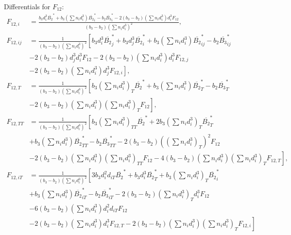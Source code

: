 \documentclass[english]{../thermomemo/thermomemo}
\newcommand*{\lb}{\left(}
\newcommand*{\rb}{\right)}
\begin{document}
Differentials for $F_{12}$:
\begin{align}
  \label{eq:F12_diff}
    F_{12,i}  &=  \frac{b_3  d_i^3  \overline{B_2}^* + b_3 \lb \sum n_i d_i^3 \rb  \overline{B_2}^*_i - b_2 \overline{B_3}^*_i - 2\lb b_3-b_2\rb \lb \sum n_i d_i^3 \rb d_i^3 F_{12}}{\lb b_3-b_2\rb \lb \sum n_i d_i^3 \rb^2}, \\
    F_{12,ij}  &=  \frac{1}{\lb b_3-b_2\rb \lb \sum n_i d_i^3 \rb^2}
    \left[ b_3  d_i^3  \overline{B_2}^*_j + b_3 d_j^3  \overline{B_2}^*_i + b_3 \lb \sum n_i d_i^3 \rb  \overline{B_2}^*_{ij} - b_2 \overline{B_3}^*_{ij} \right. \nonumber \\ &- 2\lb b_3-b_2\rb d_j^3 d_i^3 F_{12} - 2\lb b_3-b_2\rb \lb \sum n_i d_i^3 \rb d_i^3 F_{12,j} \nonumber \\ & \left.- 2\lb b_3-b_2\rb \lb \sum n_i d_i^3 \rb d_j^3 F_{12,i} \right],\\
    F_{12,T} &=  \frac{1}{\lb b_3-b_2\rb \lb \sum n_i d_i^3 \rb^2} \left[ b_3 \lb \sum n_i d_i^3 \rb_T  \overline{B_2}^* + b_3 \lb \sum n_i d_i^3 \rb  \overline{B_2}^*_T - b_2 \overline{B_3}^*_T \right. \nonumber \\ & \left. - 2\lb b_3-b_2\rb \lb \sum n_i d_{i}^3 \rb \lb \sum n_i d_{i}^3 \rb_T F_{12} \right] , \\
    F_{12,TT} &= \frac{1}{\lb b_3-b_2\rb \lb \sum n_i d_i^3 \rb^2} \left[ b_3 \lb \sum n_i d_i^3 \rb_{TT}  \overline{B_2}^* + 2 b_3 \lb \sum n_i d_i^3 \rb_T  \overline{B_2}^*_T \right. \nonumber \\
      & + b_3 \lb \sum n_i d_i^3 \rb  \overline{B_2}^*_{TT} - b_2 \overline{B_3}^*_{TT} - 2\lb b_3-b_2\rb \lb \lb \sum n_i d_{i}^3 \rb_T \rb^2 F_{12} \nonumber \\ & \left. - 2\lb b_3-b_2\rb \lb \sum n_i d_{i}^3 \rb \lb \sum n_i d_{i}^3 \rb_{TT} F_{12} - 4\lb b_3-b_2\rb \lb \sum n_i d_{i}^3 \rb \lb \sum n_i d_{i}^3 \rb_T F_{12,T} \right], \\
  F_{12,iT}  &= \frac{1}{\lb b_3-b_2\rb \lb \sum n_i d_i^3 \rb^2} \left[ 3 b_3  d_i^2 d_{iT}  \overline{B_2}^* + b_3  d_i^3  \overline{B_2}^*_T + b_3 \lb \sum n_i d_i^3 \rb_T  \overline{B_2}^*_i \right. \nonumber \\ & + b_3 \lb \sum n_i d_i^3 \rb  \overline{B_2}^*_{iT} - b_2 \overline{B_3}^*_{iT} - 2\lb b_3-b_2\rb \lb \sum n_i d_i^3 \rb_T d_i^3 F_{12} \nonumber \\ &- 6\lb b_3-b_2\rb \lb \sum n_i d_i^3 \rb d_i^2 d_{iT} F_{12} \nonumber \\ & \left.- 2\lb b_3-b_2\rb \lb \sum n_i d_i^3 \rb d_i^3 F_{12,T} - 2 \lb b_3-b_2\rb \lb \sum n_i d_i^3 \rb \lb \sum n_i d_i^3 \rb_T F_{12,i} \right]
\end{align}
\end{document}
